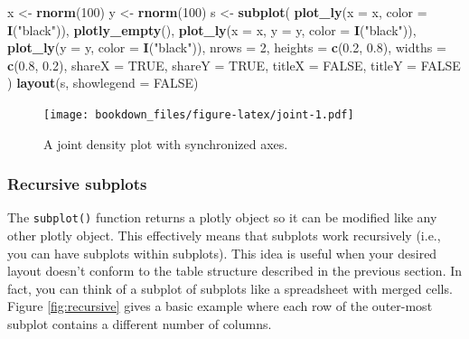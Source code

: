 \documentclass[12pt,]{isuthesis}
\newenvironment{Shaded}{\begin{snugshade}}{\end{snugshade}}
\newcommand{\KeywordTok}[1]{\textcolor[rgb]{0.13,0.29,0.53}{\textbf{{#1}}}}
\newcommand{\DataTypeTok}[1]{\textcolor[rgb]{0.13,0.29,0.53}{{#1}}}
\newcommand{\DecValTok}[1]{\textcolor[rgb]{0.00,0.00,0.81}{{#1}}}
\newcommand{\FloatTok}[1]{\textcolor[rgb]{0.00,0.00,0.81}{{#1}}}
\newcommand{\StringTok}[1]{\textcolor[rgb]{0.31,0.60,0.02}{{#1}}}
\newcommand{\OtherTok}[1]{\textcolor[rgb]{0.56,0.35,0.01}{{#1}}}
\newcommand{\NormalTok}[1]{{#1}}
\begin{document}
\begin{Shaded}
\begin{Highlighting}[]
\NormalTok{x <-}\StringTok{ }\KeywordTok{rnorm}\NormalTok{(}\DecValTok{100}\NormalTok{)}
\NormalTok{y <-}\StringTok{ }\KeywordTok{rnorm}\NormalTok{(}\DecValTok{100}\NormalTok{)}
\NormalTok{s <-}\StringTok{ }\KeywordTok{subplot}\NormalTok{(}
  \KeywordTok{plot_ly}\NormalTok{(}\DataTypeTok{x =} \NormalTok{x, }\DataTypeTok{color =} \KeywordTok{I}\NormalTok{(}\StringTok{"black"}\NormalTok{)), }
  \KeywordTok{plotly_empty}\NormalTok{(), }
  \KeywordTok{plot_ly}\NormalTok{(}\DataTypeTok{x =} \NormalTok{x, }\DataTypeTok{y =} \NormalTok{y, }\DataTypeTok{color =} \KeywordTok{I}\NormalTok{(}\StringTok{"black"}\NormalTok{)), }
  \KeywordTok{plot_ly}\NormalTok{(}\DataTypeTok{y =} \NormalTok{y, }\DataTypeTok{color =} \KeywordTok{I}\NormalTok{(}\StringTok{"black"}\NormalTok{)),}
  \DataTypeTok{nrows =} \DecValTok{2}\NormalTok{, }\DataTypeTok{heights =} \KeywordTok{c}\NormalTok{(}\FloatTok{0.2}\NormalTok{, }\FloatTok{0.8}\NormalTok{), }\DataTypeTok{widths =} \KeywordTok{c}\NormalTok{(}\FloatTok{0.8}\NormalTok{, }\FloatTok{0.2}\NormalTok{), }
  \DataTypeTok{shareX =} \OtherTok{TRUE}\NormalTok{, }\DataTypeTok{shareY =} \OtherTok{TRUE}\NormalTok{, }\DataTypeTok{titleX =} \OtherTok{FALSE}\NormalTok{, }\DataTypeTok{titleY =} \OtherTok{FALSE}
\NormalTok{)}
\KeywordTok{layout}\NormalTok{(s, }\DataTypeTok{showlegend =} \OtherTok{FALSE}\NormalTok{)}
\end{Highlighting}
\end{Shaded}

\begin{figure}[htbp]
\centering
\texttt{[image: bookdown\_files/figure-latex/joint-1.pdf]}
\caption{\label{fig:joint}A joint density plot with synchronized axes.}
\end{figure}

\subsubsection{Recursive subplots}\label{recursive-subplots}

The \texttt{subplot()} function returns a plotly object so it can be
modified like any other plotly object. This effectively means that
subplots work recursively (i.e., you can have subplots within subplots).
This idea is useful when your desired layout doesn't conform to the
table structure described in the previous section. In fact, you can
think of a subplot of subplots like a spreadsheet with merged cells.
Figure \ref{fig:recursive} gives a basic example where each row of the
outer-most subplot contains a different number of columns.
\end{document}
